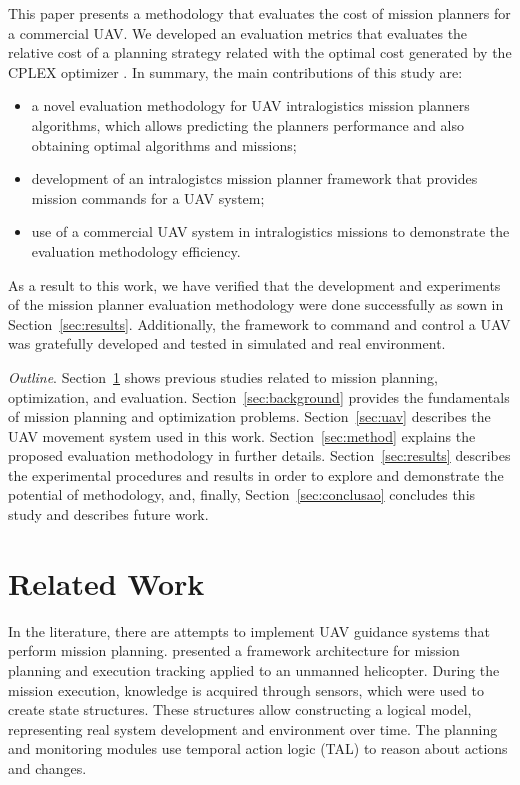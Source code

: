 \documentclass[conference,harvard,brazil,english]{sbatex}
\begin{document}
This paper presents a methodology that evaluates the cost of mission planners for a commercial UAV. We developed an evaluation metrics that evaluates the relative cost of a planning strategy related with the optimal cost generated by the CPLEX optimizer \cite{cplex2003i	log}. %
In summary, the main contributions of this study are:
\begin{itemize}
\item a novel evaluation methodology for UAV intralogistics mission planners algorithms, which allows predicting the planners performance and also obtaining optimal algorithms and missions;
\item development of an intralogistcs mission planner framework that provides mission commands for a UAV system; 
\item use of a commercial UAV system in intralogistics missions to demonstrate the evaluation methodology efficiency.
\end{itemize}

As a result to this work, we have verified that the development and experiments of the mission planner evaluation methodology were done successfully as sown in Section~\ref{sec:results}. Additionally, the framework to command and control a UAV was gratefully developed and tested in simulated and real environment.
	
\textit{Outline}. Section~\ref{sec:related} shows previous studies related to mission planning, optimization, and evaluation. Section~\ref{sec:background} provides the fundamentals of mission planning and optimization problems. Section~\ref{sec:uav} describes the UAV movement system used in this work. Section~\ref{sec:method} explains the proposed evaluation methodology in further details. Section~\ref{sec:results} describes the experimental procedures and results in order to explore and demonstrate the potential of methodology, and, finally, Section~\ref{sec:conclusao} concludes this study and describes future work.

\section{Related Work}
\label{sec:related}
In the literature, there are attempts to implement UAV guidance systems that perform mission planning.  presented a framework architecture for mission planning and execution tracking applied to an unmanned helicopter. During the mission execution, knowledge is acquired through sensors, which were used to create state structures. These structures allow constructing a logical model, representing real system development and environment over time. The planning and monitoring modules use temporal action logic (TAL) to reason about actions and changes.
\end{document}
